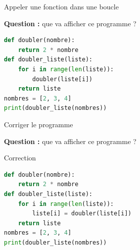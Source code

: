 \documentclass[10pt, xcolor={svgnames}]{beamer}
\begin{document}
\begin{frame}[fragile]{Appeler une fonction dans une boucle}
	
	\textbf{Question :} que va afficher ce programme ?
	
	\vspace{0.3cm}
	
	\begin{exampleblock}{}
		\begin{lstlisting}[language=Python]
def doubler(nombre):
	return 2 * nombre
def doubler_liste(liste):
	for i in range(len(liste)):
		doubler(liste[i])
	return liste
nombres = [2, 3, 4]
print(doubler_liste(nombres))
		\end{lstlisting}
	\end{exampleblock}
	
\end{frame}


\begin{frame}[fragile]{Corriger le programme}
	
\textbf{Question :} que va afficher ce programme ?
	\vspace{0.4cm}
	
	\begin{exampleblock}{Correction}
		\begin{lstlisting}[language=Python]
def doubler(nombre):
	return 2 * nombre
def doubler_liste(liste):
	for i in range(len(liste)):
		liste[i] = doubler(liste[i])
	return liste
nombres = [2, 3, 4]
print(doubler_liste(nombres))
		\end{lstlisting}
	\end{exampleblock}
	

	
\end{frame}
\end{document}
